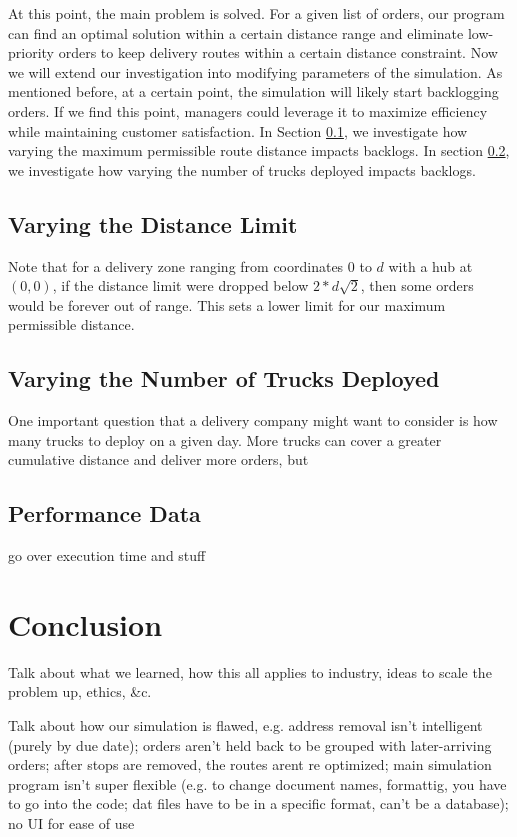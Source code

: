 \documentclass[letterpaper]{article}
\begin{document}
    At this point, the main problem is solved. For a given list of orders, our program can find an optimal solution within a certain distance range and eliminate low-priority orders to keep delivery routes within a certain distance constraint. Now we will extend our investigation into modifying parameters of the simulation. As mentioned before, at a certain point, the simulation will likely start backlogging orders. If we find this point, managers could leverage it to maximize efficiency while maintaining customer satisfaction. In Section \ref{subsection:Varying_the_Distance_Limit}, we investigate how varying the maximum permissible route distance impacts backlogs. In section \ref{subsection:Varying_the_Number_of_Trucks_Deployed}, we investigate how varying the number of trucks deployed impacts backlogs.

    \subsection{Varying the Distance Limit}
    \label{subsection:Varying_the_Distance_Limit}
    Note that for a delivery zone ranging from coordinates 0 to $d$ with a hub at $(0, 0)$, if the distance limit were dropped below $2 * d \sqrt{2}$, then some orders would be forever out of range. This sets a lower limit for our maximum permissible distance.

    \subsection{Varying the Number of Trucks Deployed}
    \label{subsection:Varying_the_Number_of_Trucks_Deployed}
    One important question that a delivery company might want to consider is how many trucks to deploy on a given day. More trucks can cover a greater cumulative distance and deliver more orders, but 

    \subsection{Performance Data}
    go over execution time and stuff

    \section{Conclusion}
    \label{section:Conclusion}
    Talk about what we learned, how this all applies to industry, ideas to scale the problem up, ethics, \&c.

    Talk about how our simulation is flawed, e.g. address removal isn't intelligent (purely by due date); orders aren't held back to be grouped with later-arriving orders; after stops are removed, the routes arent re optimized; main simulation program isn't super flexible (e.g. to change document names, formattig, you have to go into the code; dat files have to be in a specific format, can't be a database); no UI for ease of use
\end{document}

